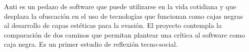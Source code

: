 Anti es un pedazo de software que puede utilizarse en la vida cotidiana y que desplaza la ofuscación en el uso de tecnologías que funcionan como cajas negras al desarrollo de capas estéticas para la evasión. El proyecto contempla la comparación de dos caminos que permitan plantear una crítica al software como caja negra. Es un primer estudio de reflexión tecno-social.



